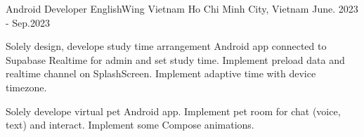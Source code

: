 \begin{cventries}
  \cventry
    {Android Developer}
    {EnglishWing Vietnam}
    {Ho Chi Minh City, Vietnam}
    {June. 2023 - Sep.2023}
    {
    \begin{cvitems}
        \item {
          Solely design, develope study time arrangement Android app connected to Supabase Realtime for admin and set study time.
          Implement preload data and realtime channel on SplashScreen.
          Implement adaptive time with device timezone.
          }
        \item {
          Solely develope virtual pet Android app.
          Implement pet room for chat (voice, text) and interact.
          Implement some Compose animations.
          }
      \end{cvitems}
    }
\end{cventries}
